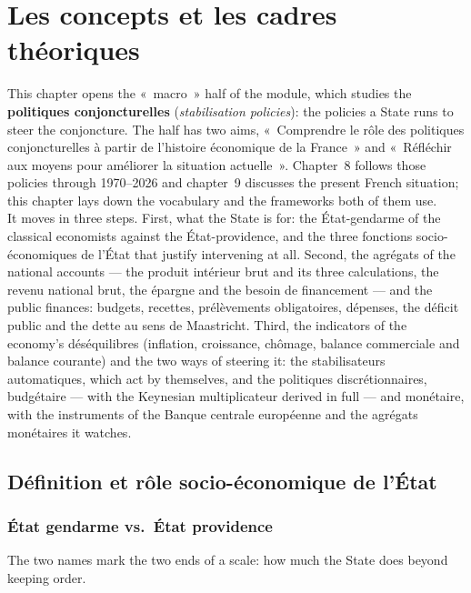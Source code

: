 \section{Les concepts et les cadres théoriques}

This chapter opens the «~macro~» half of the module, which studies the
\textbf{politiques conjoncturelles} (\textit{stabilisation policies}): the
policies a State runs to steer the conjoncture. The half has two aims,
«~Comprendre le rôle des politiques conjoncturelles à partir de l'histoire
économique de la France~» and «~Réfléchir aux moyens pour améliorer la
situation actuelle~». Chapter~8 follows those policies through 1970--2026 and
chapter~9 discusses the present French situation; this chapter lays down the
vocabulary and the frameworks both of them use.\\

It moves in three steps. First, what the State is for: the État-gendarme of the
classical economists against the État-providence, and the three fonctions
socio-économiques de l'État that justify intervening at all. Second, the
agrégats of the national accounts --- the produit intérieur brut and its three
calculations, the revenu national brut, the épargne and the besoin de
financement --- and the public finances: budgets,
recettes, prélèvements obligatoires, dépenses, the déficit public and the dette
au sens de Maastricht. Third, the indicators of the economy's déséquilibres
(inflation, croissance, chômage, balance commerciale and balance courante) and
the two ways of steering
it: the stabilisateurs automatiques, which act by themselves, and the
politiques discrétionnaires, budgétaire --- with the Keynesian multiplicateur
derived in full --- and monétaire, with the instruments of the Banque centrale
européenne and the agrégats monétaires it watches.

\subsection{Définition et rôle socio-économique de l'État}

\subsubsection{État gendarme vs.\ État providence}

The two names mark the two ends of a scale: how much the State does beyond
keeping order.

